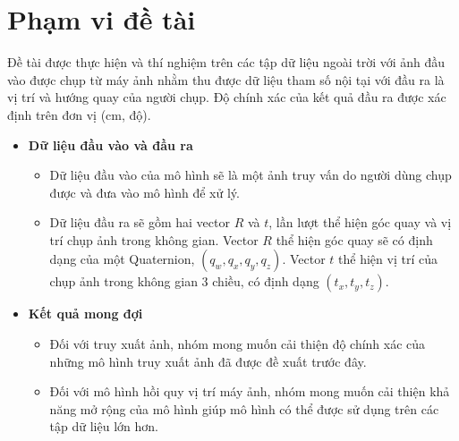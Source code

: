 \section{Phạm vi đề tài}
Đề tài được thực hiện và thí nghiệm trên các tập dữ liệu ngoài trời với ảnh đầu vào được chụp từ máy ảnh nhằm thu được dữ liệu tham số nội tại với đầu ra là vị trí và hướng quay của người chụp. Độ chính xác của kết quả đầu ra được xác định trên đơn vị (cm, độ).
\begin{itemize}
    \item \textbf{Dữ liệu đầu vào và đầu ra}
    \begin{itemize}
        \item Dữ liệu đầu vào của mô hình sẽ là một ảnh truy vấn do người dùng chụp được và đưa vào mô hình để xử lý.
        \item Dữ liệu đầu ra sẽ gồm hai vector $R$ và $t$, lần lượt thể hiện góc quay và vị trí chụp ảnh trong không gian. Vector $R$ thể hiện góc quay sẽ có định dạng của một Quaternion, $(q_w,q_x,q_y,q_z)$. Vector $t$ thể hiện vị trí của chụp ảnh trong không gian 3 chiều, có định dạng $(t_x,t_y,t_z)$.
    \end{itemize}
    \item \textbf{Kết quả mong đợi}
    \begin{itemize}
        \item Đối với truy xuất ảnh, nhóm mong muốn cải thiện độ chính xác của những mô hình truy xuất ảnh đã được đề xuất trước đây.
        \item Đối với mô hình hồi quy vị trí máy ảnh, nhóm mong muốn cải thiện khả năng mở rộng của mô hình giúp mô hình có thể được sử dụng trên các tập dữ liệu lớn hơn.
    \end{itemize}
\end{itemize}

